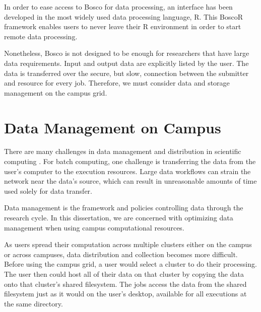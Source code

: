 In order to ease access to Bosco for data processing, an interface has been developed in the most widely used data processing language, R.  This BoscoR framework enables users to never leave their R environment in order to start remote data processing.

Nonetheless, Bosco is not designed to be enough for researchers that have large data requirements.  Input and output data are explicitly listed by the user.  The data is transferred over the secure, but slow, connection between the submitter and resource for every job.  Therefore, we must consider data and storage management on the campus grid.










\section{Data Management on Campus}

There are many challenges in data management and distribution in scientific computing \cite{deelman2008data}.  For batch computing, one challenge is transferring the data from the user's computer to the execution resources.  Large data workflows can strain the network near the data's source, which can result in unreasonable amounts of time used solely for data transfer.

Data management is the framework and policies controlling data through the research cycle.  In this dissertation, we are concerned with optimizing data management when using campus computational resources.

As users spread their computation across multiple clusters either on the campus or across campuses, data distribution and collection becomes more difficult.  Before using the campus grid, a user would select a cluster to do their processing.  The user then could host all of their data on that cluster by copying the data onto that cluster's shared filesystem.  The jobs access the data from the shared filesystem just as it would on the user's desktop, available for all executions at the same directory.


